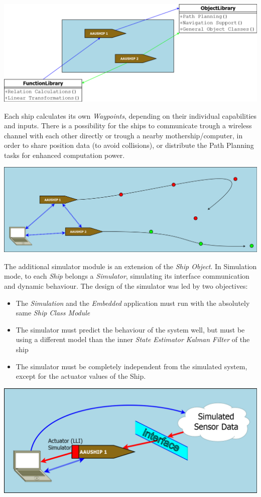 \includegraphics[width = \textwidth]{img/HLIFigures/ActorModel/Actor-model1.png}


Each ship calculates its own \emph{Waypoints}, depending on their individual capabilities and inputs.
There is a possibility for the ships to communicate trough a wireless channel with each other directly or trough a nearby mothership/computer, in order to share position data (to avoid collisions), or distribute the Path Planning tasks for enhanced computation power.

\includegraphics[width = \textwidth]{img/HLIFigures/ActorModel/Actor-model2.png}


The additional simulator module is an extension of the \emph{Ship Object}. In Simulation mode, to each \emph{Ship} belongs a \emph{Simulator}, simulating its interface communication and dynamic behaviour. The design of the simulator was led by two objectives:
\begin{itemize}
\item The \emph{Simulation} and the \emph{Embedded} application must run with the absolutely same \emph{Ship Class Module}
\item The simulator must predict the behaviour of the system well, but must be using a different model than the inner \emph{State Estimator Kalman Filter} of the ship
\item The simulator must be completely independent from the simulated system, except for the actuator values of the Ship.
\end{itemize}

\includegraphics[width = \textwidth]{img/HLIFigures/ActorModel/SimModel.png}

